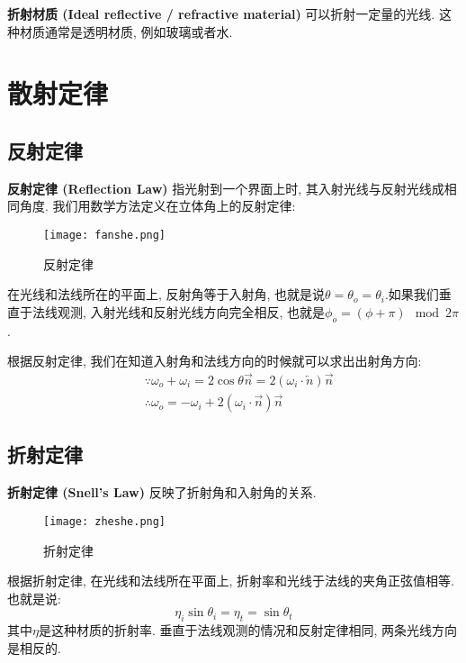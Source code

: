 \textbf{折射材质 (Ideal reflective / refractive material) } 可以折射一定量的光线. 这种材质通常是透明材质, 例如玻璃或者水. 

\section{散射定律}

\subsection{反射定律}

\textbf{反射定律 (Reflection Law) }指光射到一个界面上时, 其入射光线与反射光线成相同角度. 我们用数学方法定义在立体角上的反射定律: 

\begin{figure}[H]
	\centering
	\texttt{[image: fanshe.png]}
	\caption{反射定律}
	\label{fig:fanshed}
\end{figure}

在光线和法线所在的平面上, 反射角等于入射角, 也就是说$\theta=\theta_o=\theta_i$.如果我们垂直于法线观测, 入射光线和反射光线方向完全相反, 也就是$\phi_o=(\phi+\pi)\mod 2\pi$.

根据反射定律, 我们在知道入射角和法线方向的时候就可以求出出射角方向: 
\begin{equation}
	\begin{split}
		&\because \omega_o + \omega_i = 2\cos\theta \overrightarrow{n} = 2(\omega_i\cdot \overleftarrow{n})\overrightarrow{n}\\
		&\therefore \omega_o = -\omega_i + 2(\omega_i\cdot \overrightarrow{n})\overrightarrow{n}
	\end{split}
\end{equation}

\subsection{折射定律}

\textbf{折射定律 (Snell's Law) }反映了折射角和入射角的关系. 

\begin{figure}[H]
	\centering
	\texttt{[image: zheshe.png]}
	\caption{折射定律}
	\label{fig:zheshe}
\end{figure}

根据折射定律, 在光线和法线所在平面上, 折射率和光线于法线的夹角正弦值相等. 也就是说: 
\begin{equation}
	\eta_i\sin\theta_i = \eta_t=\sin\theta_t
\end{equation}
其中$\eta$是这种材质的折射率. 垂直于法线观测的情况和反射定律相同, 两条光线方向是相反的. 

